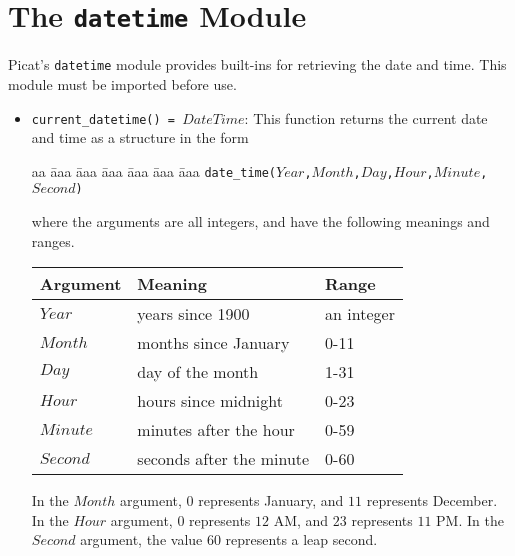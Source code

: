 
\chapter{\label{chapter:datetime}The \texttt{datetime} Module}

Picat's \texttt{datetime} module provides built-ins for retrieving the date and time. This module must be imported before use.

\begin{itemize}
\item \texttt{current\_datetime() = $DateTime$}: This function returns the current date and time as a structure in the form 
\begin{tabbing}
aa \= aaa \= aaa \= aaa \= aaa \= aaa \= aaa \kill
\> \texttt{date\_time($Year$,$Month$,$Day$,$Hour$,$Minute$,$Second$)}
\end{tabbing}
where the arguments are all integers, and have the following meanings and ranges.

\begin{center}
\begin{tabular}{|l|l|l||}
\hline
\textbf{Argument} & \textbf{Meaning} & \textbf{Range} \\
\hline 
\hline 
$Year$ & years since 1900 & an integer \\
$Month$ & months since January & 0-11 \\
$Day$ & day of the month & 1-31 \\
$Hour$ & hours since midnight & 0-23 \\
$Minute$ & minutes after the hour & 0-59 \\
$Second$ & seconds after the minute & 0-60 \\
\hline
\end{tabular}
\end{center}

\noindent
In the $Month$ argument, $0$ represents January, and $11$ represents December.  In the $Hour$ argument, $0$ represents $12$ AM, and $23$ represents $11$ PM.  In the $Second$ argument, the value $60$ represents a leap second.


\end{itemize}
